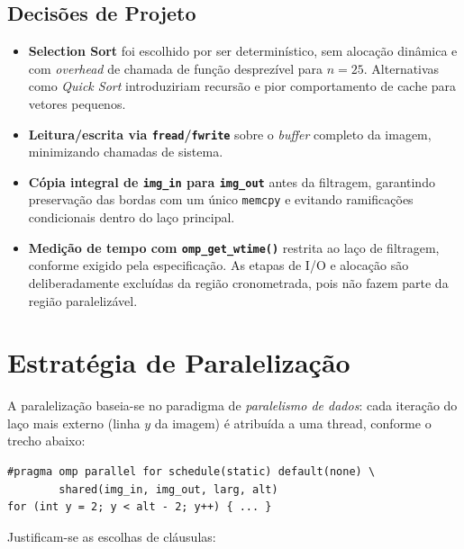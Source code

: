 \documentclass[12pt]{article}
\begin{document}
\subsection{Decisões de Projeto}

\begin{itemize}
	\item \textbf{Selection Sort} foi escolhido por ser determinístico, sem alocação dinâmica e com \textit{overhead} de chamada de função desprezível para $n=25$. Alternativas como \textit{Quick Sort} introduziriam recursão e pior comportamento de cache para vetores pequenos.
	\item \textbf{Leitura/escrita via \texttt{fread}/\texttt{fwrite}} sobre o \textit{buffer} completo da imagem, minimizando chamadas de sistema.
	\item \textbf{Cópia integral de \texttt{img\_in} para \texttt{img\_out}} antes da filtragem, garantindo preservação das bordas com um único \texttt{memcpy} e evitando ramificações condicionais dentro do laço principal.
	\item \textbf{Medição de tempo com \texttt{omp\_get\_wtime()}} restrita ao laço de filtragem, conforme exigido pela especificação. As etapas de I/O e alocação são deliberadamente excluídas da região cronometrada, pois não fazem parte da região paralelizável.
\end{itemize}

\newpage
\section{Estratégia de Paralelização}

A paralelização baseia-se no paradigma de \textit{paralelismo de dados}: cada iteração do laço mais externo (linha $y$ da imagem) é atribuída a uma thread, conforme o trecho abaixo:

\begin{verbatim}
#pragma omp parallel for schedule(static) default(none) \
        shared(img_in, img_out, larg, alt)
for (int y = 2; y < alt - 2; y++) { ... }
\end{verbatim}

Justificam-se as escolhas de cláusulas:
\end{document}

